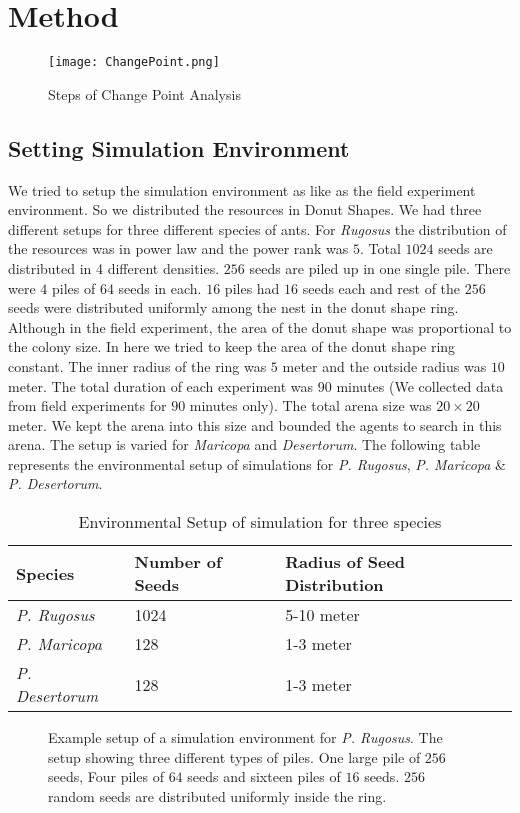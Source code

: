 \chapter{Method}
\begin{figure}[h]
	\texttt{[image: ChangePoint.png]}
	\caption{Steps of Change Point Analysis}
\end{figure}
\section{\label{section:Setting Simulation Environment}Setting Simulation Environment}
We tried to setup the simulation environment as like as the field experiment environment. So we distributed the resources in Donut Shapes. We had three different setups for three different species of ants. For \textit{Rugosus} the distribution of the resources was in power law and the power rank was $5$. Total $1024$ seeds are distributed in 4 different densities. $256$ seeds are piled up in one single pile. There were $4$ piles of $64$ seeds in each. $16$ piles had $16$ seeds each and rest of the $256$ seeds were distributed uniformly among the nest in the donut shape ring. Although in the field experiment, the area of the donut shape was proportional to the colony size. In here we tried to keep the area of the donut shape ring constant. The inner radius of the ring was $5$ meter and the outside radius was $10$ meter. The total duration of each experiment was $90$ minutes (We collected data from field experiments for $90$ minutes only). The total arena size was $20\times20$ meter. We kept the arena into this size and bounded the agents to search in this arena.  The setup is varied for \textit{Maricopa} and \textit{Desertorum}. The following table represents the environmental setup of simulations for \textit{P. Rugosus}, \textit{P. Maricopa} \& \textit{P. Desertorum}.
\begin{table}
	\begin{tabular}{ |p{}|p{}|p{}| } 
		\hline
		\textbf{Species} & \textbf{Number of Seeds} & \textbf{Radius of Seed Distribution} \\
		\hline 
		\textit{P. Rugosus} & 1024 & 5-10 meter\\ 
		\hline
		\textit{P. Maricopa} & 128 & 1-3 meter\\ 
		\hline
		 \textit{P. Desertorum} & 128 & 1-3 meter\\
		\hline
	\end{tabular}
	\caption{Environmental Setup of simulation for three species}
\end{table}
\begin{figure}[h]
	\caption{Example setup of a simulation environment for \textit{P. Rugosus}. The setup showing three different types of piles. One large pile of $256$ seeds, Four piles of $64$ seeds and sixteen piles of $16$ seeds. $256$ random seeds are distributed uniformly inside the ring. }
\end{figure}

